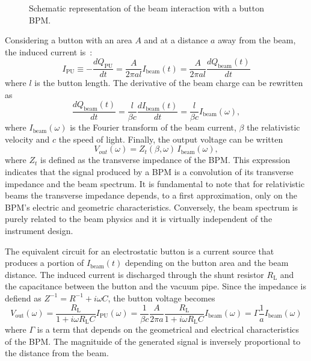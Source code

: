 \begin{figure}[!b]
\centering

\caption{Schematic representation of the beam interaction with a button BPM.}
\label{fig:button}
\end{figure}

Considering a button with an area $A$ and at a distance $a$ away from the beam, the induced current is~\cite{Forck:CAS}:
\begin{equation}
I_\text{PU} \equiv - \frac{dQ_\text{PU}}{dt} = \frac{A}{2\pi a l} I_\text{beam}(t) = \frac{A}{2\pi a l} \frac{dQ_\text{beam}(t)}{dt}
\end{equation}
where $l$ is the button length. The derivative of the beam charge can be rewritten as
\begin{equation}
\frac{dQ_\text{beam}(t)}{dt} = \frac{l}{\beta c} \frac{dI_\text{beam}(t)}{dt} = \frac{l}{\beta c} I_\text{beam} (\omega),
\end{equation}
where $I_\text{beam}(\omega)$ is the Fourier transform of the beam current, $\beta$ the relativistic velocity and $c$ the speed of light.
Finally, the output voltage can be written 
\begin{equation}
V_{out}(\omega) = Z_t(\beta, \omega) \, I_\text{beam}(\omega),
\end{equation}
where $Z_t$ is defined as the transverse impedance of the BPM. This expression indicates that the signal produced by a BPM is a convolution of its transverse impedance and the beam spectrum. It is fundamental to note that for relativistic beams the transverse impedance depends, to a first approximation, only on the BPM's electric and geometric characteristics. Conversely, the beam spectrum is purely related to the beam physics and it is virtually independent of the instrument design.

The equivalent circuit for an electrostatic button is a current source that produces a portion of $I_\text{beam}(t)$ depending on the button area and the beam distance. The induced current is discharged through the shunt resistor $R_\text{L}$ and the capacitance between the button and the vacuum pipe. Since the impedance is defiend as $Z^{-1} = R^{-1} + i\omega C$, the button voltage becomes
\begin{equation}
V_\text{out}(\omega) = \frac{R_\text{L}}{1+i\omega R_\text{L} C} I_\text{PU}(\omega) = \frac{1}{\beta c} \frac{A}{2\pi a} \frac{R_\text{L}}{1+i\omega R_\text{L} C} I_\text{beam}(\omega) = \Gamma \frac{1}{a} I_\text{beam}(\omega)
\end{equation}
where $\Gamma$ is a term that depends on the geometrical and electrical characteristics of the BPM. The magnituide of the generated signal is inversely proportional to the distance from the beam.

